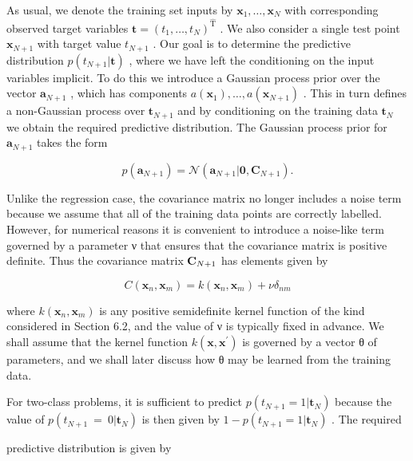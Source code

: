 \documentclass[
  10
]{article}
\begin{document}
As usual, we denote the training set inputs by
\(\mathbf { x } _ { 1 } , \ldots , \mathbf { x } _ { N }\) with
corresponding observed target variables
\(\mathbf { t } = ( t _ { 1 } , \ldots , t _ { N } ) ^ { \mathrm { \hat { T } } }\)
. We also consider a single test point \(\mathbf { x } _ { N + 1 }\)
with target value \(t _ { N + 1 }\) . Our goal is to determine the
predictive distribution \(p ( t _ { N + 1 } | \mathbf { t } )\) , where
we have left the conditioning on the input variables implicit. To do
this we introduce a Gaussian process prior over the vector
\(\mathbf { a } _ { N + 1 }\) , which has components
\(a ( \mathbf { x } _ { 1 } ) , \dots , a ( \mathbf { x } _ { N + 1 } )\)
. This in turn defines a non-Gaussian process over
\(\mathbf { t } _ { N + 1 }\) and by conditioning on the training data
\(\mathbf { t } _ { N }\) we obtain the required predictive
distribution. The Gaussian process prior for
\(\mathbf { a } _ { N + 1 }\) takes the form

\[
p (\mathbf {a} _ {N + 1}) = \mathcal {N} (\mathbf {a} _ {N + 1} | \mathbf {0}, \mathbf {C} _ {N + 1}).\tag{6.74}
\]

Unlike the regression case, the covariance matrix no longer includes a
noise term because we assume that all of the training data points are
correctly labelled. However, for numerical reasons it is convenient to
introduce a noise-like term governed by a parameter ν that ensures that
the covariance matrix is positive definite. Thus the covariance matrix
\({ \bf C } _ { N + 1 }\) has elements given by

\[
C (\mathbf {x} _ {n}, \mathbf {x} _ {m}) = k (\mathbf {x} _ {n}, \mathbf {x} _ {m}) + \nu \delta_ {n m}\tag{6.75}
\]

where \(k ( \mathbf { x } _ { n } , \mathbf { x } _ { m } )\) is any
positive semidefinite kernel function of the kind considered in Section
6.2, and the value of ν is typically fixed in advance. We shall assume
that the kernel function
\(k ( \mathbf { x } , \mathbf { x } ^ { \prime } )\) is governed by a
vector θ of parameters, and we shall later discuss how θ may be learned
from the training data.

For two-class problems, it is sufficient to predict
\(p ( t _ { N + 1 } = 1 | \mathbf { t } _ { N } )\) because the value of
\(p ( t _ { N + 1 } \ = \ 0 | \mathbf { t } _ { N } )\) is then given by
\(1 - p ( t _ { N + 1 } = 1 | \mathbf { t } _ { N } )\) . The required

predictive distribution is given by
\end{document}
